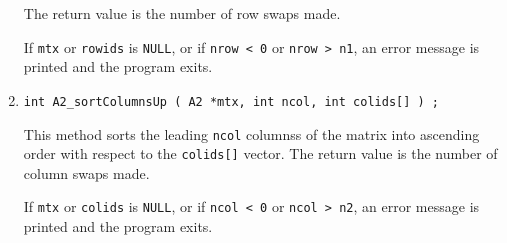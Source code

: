 \begin{enumerate}
The return value is the number of row swaps made.
\par
\par {}
If {\tt mtx} or {\tt rowids} is {\tt NULL},
or if {\tt nrow < 0} or {\tt nrow > n1},
an error message is printed and the program exits.
\item
\begin{verbatim}
int A2_sortColumnsUp ( A2 *mtx, int ncol, int colids[] ) ;
\end{verbatim}
This method sorts the leading {\tt ncol} columnss of the matrix 
into ascending order with respect to the {\tt colids[]} vector.
The return value is the number of column swaps made.
\par
\par {}
If {\tt mtx} or {\tt colids} is {\tt NULL},
or if {\tt ncol < 0} or {\tt ncol > n2},
an error message is printed and the program exits.
\end{enumerate}
\par

